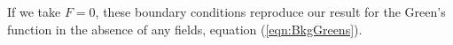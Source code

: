 If we take $F=0$, these boundary conditions reproduce our result for the 
Green's function in the absence of any fields, equation (\ref{eqn:BkgGreens}).  




